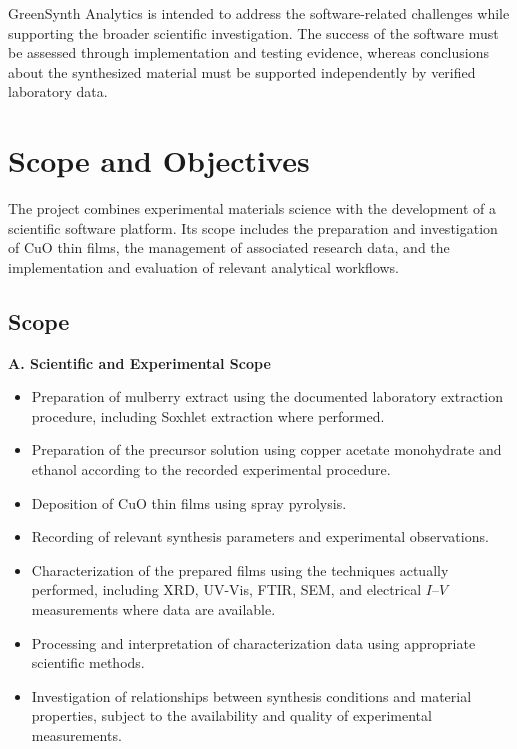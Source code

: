 \documentclass[12pt,a4paper,oneside]{report}
\begin{document}
{{{GreenSynth Analytics is intended to address the software-related challenges while supporting the broader scientific investigation. The success of the software must be assessed through implementation and testing evidence, whereas conclusions about the synthesized material must be supported independently by verified laboratory data.

\section{Scope and Objectives}

The project combines experimental materials science with the development of a scientific software platform. Its scope includes the preparation and investigation of $\text{CuO}$ thin films, the management of associated research data, and the implementation and evaluation of relevant analytical workflows.

\subsection{Scope}

\noindent\textbf{A. Scientific and Experimental Scope}
\begin{itemize}
    \item Preparation of mulberry extract using the documented laboratory extraction procedure, including Soxhlet extraction where performed.
    \item Preparation of the precursor solution using copper acetate monohydrate and ethanol according to the recorded experimental procedure.
    \item Deposition of $\text{CuO}$ thin films using spray pyrolysis.
    \item Recording of relevant synthesis parameters and experimental observations.
    \item Characterization of the prepared films using the techniques actually performed, including XRD, UV-Vis, FTIR, SEM, and electrical $I\text{--}V$ measurements where data are available.
    \item Processing and interpretation of characterization data using appropriate scientific methods.
    \item Investigation of relationships between synthesis conditions and material properties, subject to the availability and quality of experimental measurements.
\end{itemize}

}}}
\end{document}
